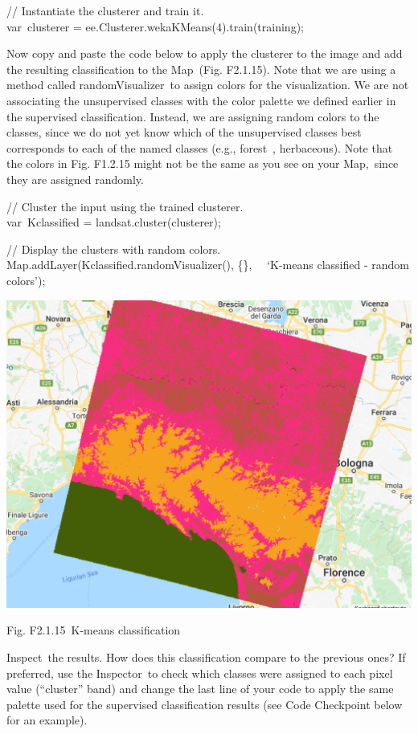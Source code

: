 \documentclass[
  letterpaper,
  DIV=11,
  numbers=noendperiod]{scrreprt}
\begin{document}
// Instantiate the clusterer and train it.\\
var~clusterer = ee.Clusterer.wekaKMeans(4).train(training);

Now copy and paste the code below to apply the clusterer to the image
and add the resulting classification to the Map~(Fig. F2.1.15). Note
that we are using a method called randomVisualizer~to assign colors for
the visualization. We are not associating the unsupervised classes with
the color palette we defined earlier in the supervised classification.
Instead, we are assigning random colors to the classes, since we do not
yet know which of the unsupervised classes best corresponds to each of
the named classes (e.g., forest~, herbaceous). Note that the colors in
Fig. F1.2.15 might not be the same as you see on your Map,~since they
are assigned randomly.

// Cluster the input using the trained clusterer.\\
var~Kclassified = landsat.cluster(clusterer);

// Display the clusters with random colors.\\
Map.addLayer(Kclassified.randomVisualizer(), \{\},~ ~`K-means classified
- random colors');

\includegraphics{./F2/image31.png}

Fig. F2.1.15~K-means classification

Inspect~the results. How does this classification compare to the
previous ones? If preferred, use the Inspector~to check which classes
were assigned to each pixel value (``cluster'' band) and change the last
line of your code to apply the same palette used for the supervised
classification results (see Code Checkpoint below for an example).
\end{document}
